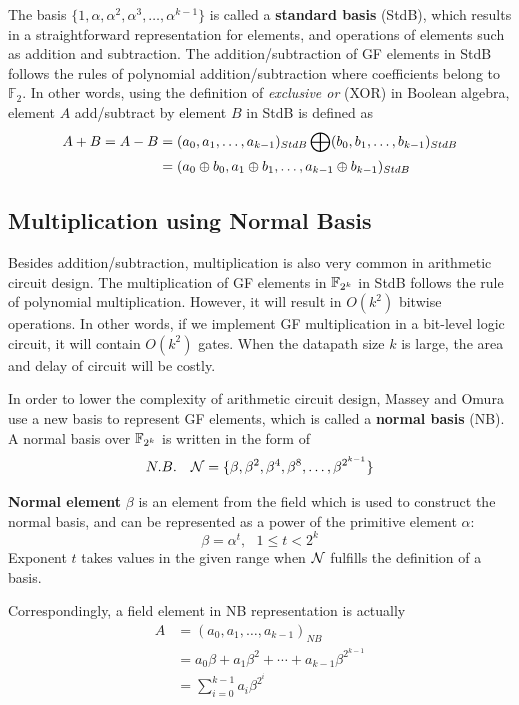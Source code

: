 The basis $\{1,\alpha,\alpha^2,\alpha^3,\dots,\alpha^{k-1}\}$ is called a {\bf standard basis} (StdB), which results in
a straightforward representation for elements, and operations of elements such as addition and subtraction.
The addition/subtraction of GF elements in StdB follows the rules of polynomial addition/subtraction
where coefficients belong to $\mathbb F_2$. In other words, using the definition of {\it exclusive or} (XOR) in
Boolean algebra, element $A$ add/subtract by element $B$ in StdB is defined as
\begin{align}\label{eqn:StdB}
A+B = A-B &= (a_0,a_1,\dots,a_{k-1})_{StdB} \bigoplus (b_0,b_1,\dots,b_{k-1})_{StdB} \nonumber\\
&=(a_0\oplus b_0, a_1\oplus b_1,\dots,a_{k-1}\oplus b_{k-1})_{StdB} 
\end{align}

\subsection{Multiplication using Normal Basis}
Besides addition/subtraction, multiplication is also very common in arithmetic circuit design.
The multiplication of GF elements in ${\mathbb{F}}_{2^k}$ in StdB follows the rule of polynomial multiplication.
However, it will result in $O(k^2)$ bitwise operations. In other words, if we implement GF multiplication
in a bit-level logic circuit, it will contain $O(k^2)$ gates. When the datapath size $k$ is large,
the area and delay of circuit will be costly.

In order to lower the complexity of arithmetic circuit design, Massey and Omura \cite{MasseyOmura} %
use a new basis to represent GF elements, which is called a {\bf normal basis} (NB).
A normal basis over ${\mathbb{F}}_{2^k}$ is written in the form of
\begin{equation*}
N.B. ~~~ {\mathcal{N}} = \{\beta,\beta^2,\beta^4,\beta^8,\dots,\beta^{2^{k-1}}\}
\end{equation*}

{\bf Normal element} $\beta$ is an element from the field which is used to construct the normal basis,
and can be represented as a power of the primitive element $\alpha$: 
\begin{equation*}
\beta = \alpha^t, ~~~ 1\leq t<2^k
\end{equation*}
Exponent $t$ takes values in the given range when ${\mathcal{N}}$ fulfills the definition of a basis.

Correspondingly, a field element in NB representation is actually
\begin{align*}
A &= (a_0,a_1,\dots,a_{k-1})_{NB} \\
  &= a_0\beta+a_1\beta^2+\cdots+a_{k-1}\beta^{2^{k-1}} \\
  &= \sum_{i=0}^{k-1} a_i\beta^{2^i}
\end{align*}

